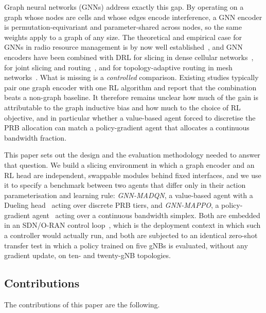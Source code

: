 \documentclass[journal]{IEEEtran}
\begin{document}
Graph neural networks (GNNs) address exactly this gap. By operating on
a graph whose nodes are cells and whose edges encode interference, a
GNN encoder is permutation-equivariant and parameter-shared across
nodes, so the same weights apply to a graph of any size. The theoretical
and empirical case for GNNs in radio resource management is by now well
established~\cite{shen2021gnnrrm,shen2023theory,he2021gnnoverview}, and
GNN encoders have been combined with DRL for slicing in dense cellular
networks~\cite{shao2021gat}, for joint slicing and
routing~\cite{dong2022gcnslicing}, and for topology-adaptive routing in
mesh networks~\cite{xu2026graphsage}. What is missing is a
\emph{controlled} comparison. Existing studies typically pair one graph
encoder with one RL algorithm and report that the combination beats a
non-graph baseline. It therefore remains unclear how much of the gain
is attributable to the graph inductive bias and how much to the choice
of RL objective, and in particular whether a value-based agent forced
to discretise the PRB allocation can match a policy-gradient agent that
allocates a continuous bandwidth fraction.

This paper sets out the design and the evaluation methodology needed to
answer that question. We build a slicing environment in which a graph
encoder and an RL head are independent, swappable modules behind fixed
interfaces, and we use it to specify a benchmark between two agents
that differ only in their action parameterisation and learning rule:
\emph{GNN-MADQN}, a value-based agent with a Dueling
head~\cite{wang2016dueling} acting over discrete PRB tiers, and
\emph{GNN-MAPPO}, a policy-gradient agent~\cite{schulman2017ppo,yu2022mappo}
acting over a continuous bandwidth simplex. Both are embedded in an
SDN/O-RAN control loop~\cite{polese2023oran}, which is the deployment
context in which such a controller would actually run, and both are
subjected to an identical zero-shot transfer test in which a policy
trained on five gNBs is evaluated, without any gradient update, on ten-
and twenty-gNB topologies.

\subsection{Contributions}
The contributions of this paper are the following.
\end{document}
